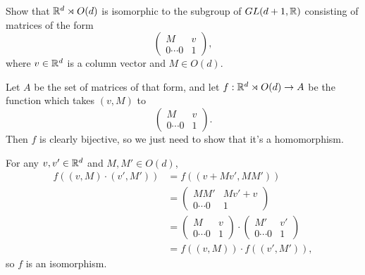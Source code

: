 \documentclass{article}
\begin{document}
\bigskip
\begin{prob}
    Show that $\mathbb{R}^d \rtimes O(d)$ is isomorphic to the subgroup of $GL(d+1, \mathbb{R})$ consisting of matrices of the form
    \[ \begin{pmatrix}
        M & v \\
        0 \cdots 0 & 1
    \end{pmatrix}, \]
    where $v \in \mathbb{R}^d$ is a column vector and $M \in O(d)$.
\end{prob}
Let $A$ be the set of matrices of that form, and let $f: \mathbb{R}^d \rtimes O(d) \rightarrow A$ be the function which takes $(v, M)$ to
\[ \begin{pmatrix}
    M & v \\
    0 \cdots 0 & 1
\end{pmatrix}. \]
Then $f$ is clearly bijective, so we just need to show that it's a homomorphism.
\par
For any $v, v' \in \mathbb{R}^d$ and $M, M' \in O(d)$,
\begin{align*}
    f((v, M)\cdot (v', M')) &= f((v+Mv', MM')) \\
                            &= \begin{pmatrix}
                                MM' & Mv'+v \\
                                0 \cdots 0 & 1
                            \end{pmatrix} \\
                            &= \begin{pmatrix}
                                M & v \\
                                0 \cdots 0 & 1
                            \end{pmatrix} \cdot \begin{pmatrix}
                                M' & v' \\
                                0 \cdots 0 & 1
                            \end{pmatrix} \\
                            &= f((v,M))\cdot f((v',M')),
\end{align*}
so $f$ is an isomorphism.
\end{document}
